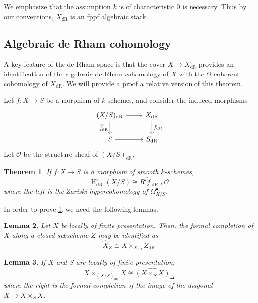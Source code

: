 \documentclass{article}
\newtheorem{theorem}{Theorem}[section]
\newtheorem{lemma}[theorem]{Lemma}
\theoremstyle{definition}
\theoremstyle{remark}
\newcommand{\scr}[1]{\mathscr{#1}}
\DeclareMathOperator{\dr}{dR}
\DeclareMathOperator{\h}{H}
\begin{document}
We emphasize that the assumption $k$ is of characteristic 0 is necessary. Thus by our conventions, $X_{\dr}$ is an fppf algebraic stack. 

\subsection{Algebraic de Rham cohomology} A key feature of the de Rham space is that the cover $X \to X_{\dr}$ provides an identification of the algebraic de Rham cohomology of $X$ with the $\scr{O}$-coherent cohomology of $X_{\dr}$. We will provide a proof a relative version of this theorem. 

Let $f: X \to S$ be a morphism of $k$-schemes, and consider the induced morphisms
\[\begin{tikzcd}
  {(X/S)_{\dr}} & {X_{\dr}} \\
  S & {S_{\dr}}
  \arrow[, from=1-1, to=1-2]
  \arrow["{\widetilde{f}_{\dr}}"', from=1-1, to=2-1]
  \arrow["{f_{\dr}}", from=1-2, to=2-2]
  \arrow[, from=2-1, to=2-2]
\end{tikzcd}\]
Let $\scr{O}$ be the structure sheaf of $(X/S)_{\dr}$.

\begin{theorem}\label{dR-comp} If $f: X \to S$ is a morphism of smooth $k$-schemes,
$$ \h^i_{\dr}(X/S) \cong R^i \widetilde{f}_{\dr*} \scr{O}$$
where the left is the Zariski hypercohomology of $\Omega^\bullet_{X/S}$.
\end{theorem}

In order to prove \ref{dR-comp}, we need the following lemmas.

\begin{lemma}\label{formal-completion} Let $X$ be locally of finite presentation. Then, the formal completion of $X$ along a closed subscheme $Z$ may be identified as
$$ \widehat{X}_{Z} \cong X \times_{X_{\dr}} Z_{\dr} $$
\end{lemma}

\begin{lemma}\label{diagonal} If $X$ and $S$ are locally of finite presentation, 
$$ X \times_{(X/S)_{\dr}} X \cong \widehat{(X \times_S X)}_\Delta$$
where the right is the formal completion of the image of the diagonal $X \to X \times_S X$.
\end{lemma}
\end{document}
